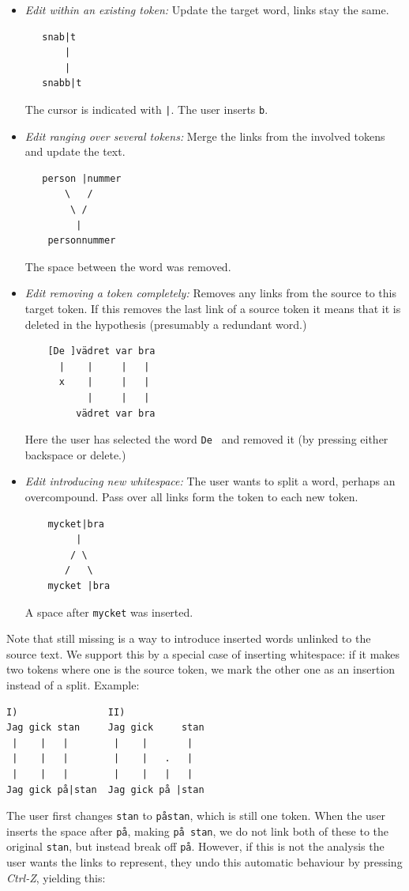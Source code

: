 \documentclass[10pt, a4paper]{article}
\newcommand{\dan}[1]{{\color{Fuchsia}{Dan: #1}}}
\begin{document}
\begin{itemize}

\item {\it Edit within an existing token:}
Update the target word, links stay the same.
\begin{verbatim}
   snab|t
       |
       |
   snabb|t
\end{verbatim}
The cursor is indicated with \verb!|!. The user inserts \verb!b!.

\item {\it Edit ranging over several tokens:}
Merge the links from the involved tokens and update the text.
\begin{verbatim}
   person |nummer
       \   /
        \ /
         |
    personnummer
\end{verbatim}
The space between the word was removed.

\item {\it Edit removing a token completely:}
Removes any links from the source to this target token.
If this removes the last link of a source token it means that
it is deleted in the hypothesis (presumably a redundant word.)
\begin{verbatim}
    [De ]vädret var bra
      |    |     |   |
      x    |     |   |
           |     |   |
         vädret var bra
\end{verbatim}
Here the user has selected the word \verb!De ! and removed it
(by pressing either backspace or delete.)

\item {\it Edit introducing new whitespace:}
The user wants to split a word, perhaps an overcompound.
Pass over all links form the token to each new token.
\begin{verbatim}
    mycket|bra
         |
        / \
       /   \
    mycket |bra
\end{verbatim}
A space after \verb!mycket! was inserted.
\end{itemize}

Note that still missing is a way to introduce inserted words
unlinked to the source text. We support this by a special case of
inserting whitespace: if it makes two tokens where one is the source
token, we mark the other one as an insertion instead of a split. Example:

\begin{verbatim}
I)                II)
Jag gick stan     Jag gick     stan
 |    |   |        |    |       |
 |    |   |        |    |   .   |
 |    |   |        |    |   |   |
Jag gick på|stan  Jag gick på |stan
\end{verbatim}
The user first changes \verb!stan! to \verb!påstan!, which is still one token.
When the user inserts the space after \verb!på!, making \verb!på stan!, we do
not link both of these to the original \verb!stan!,
but instead break off \verb!på!.
However, if this is not the analysis the user wants the links to represent,
they undo this automatic behaviour by pressing {\it Ctrl-Z},
yielding this:
\end{document}
